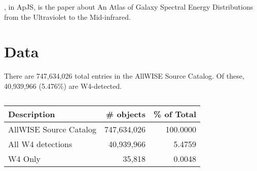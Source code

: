 \documentclass[usenatbib]{mn2e}
\begin{document}
\citet{Brown14a}, in ApJS, is the paper about An Atlas of Galaxy Spectral Energy Distributions from the Ultraviolet to the Mid-infrared.\\



\section{Data}
There are 747,634,026 total entries in the AllWISE Source Catalog. 
Of these, 40,939,966 (5.476\%) are W4-detected. 


\begin{table}
  \begin{center}
    \begin{tabular}{l rr}
      \hline
      \hline
      Description & \#  objects & \% of Total \\         
      \hline  
      AllWISE Source Catalog & 747,634,026  & 100.0000 \\
      All W4 detections          &  40,939,966  &      5.4759 \\
      W4 Only                        &         35,818  &      0.0048\\
     \hline
      \hline
    \end{tabular}
    \caption{}
    \label{tab:ERQ_key_numbers}
  \end{center}
  \vspace{-8pt}
\end{table}




\end{document}
